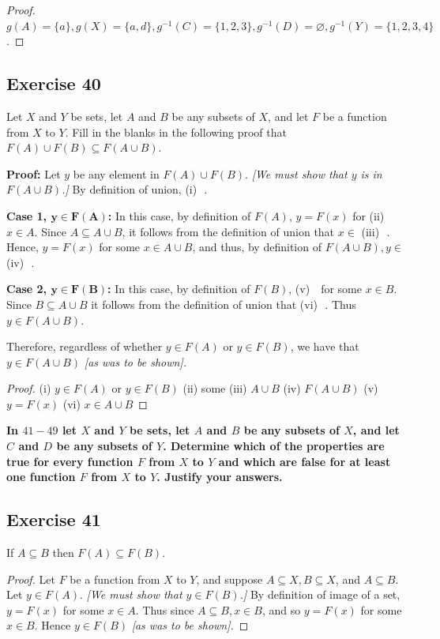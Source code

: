 \documentclass[14pt]{extarticle}
\newcommand{\es}{\varnothing}
\newcommand{\fbl}{\underline{\hspace{1cm}}\,\,}
\newcommand{\cy}{\color{cyan}}
\begin{document}
\begin{proof}
\(g(A) = \{a\}, g(X) = \{a, d\}, g^{-1}(C) = \{1, 2, 3\}, g^{-1}(D) = \es, g^{-1}(Y) = \{1, 2, 3, 4\}\).
\end{proof}

\subsection{Exercise 40}
Let $X$ and $Y$ be sets, let $A$ and $B$ be any subsets of $X$, and let $F$ be a function from $X$ to $Y$. Fill in the 
blanks in the following proof that \(F(A) \cup F (B) \subseteq F(A \cup B)\).

{\bf Proof:} Let $y$ be any element in \(F(A) \cup F(B)\). {\it [We must show that $y$ is in \(F(A \cup B)\).]} By 
definition of union, {\cy (i) \fbl.} 

{\bf Case 1, \(\bm{y \in F(A)}\):} In this case, by definition of $F(A)$, \(y = F(x)\) for {\cy (ii) \fbl} 
\(x \in A\). Since \(A \subseteq A \cup B\), it follows from the definition of union that \(x \in\) {\cy (iii) 
\fbl.} Hence, \(y = F(x)\) for some \(x \in A \cup B\), and thus, by definition of \(F(A \cup B), y \in\) {\cy (iv) \fbl.}

{\bf Case 2, \(\bm{y \in F(B)}\):} In this case, by definition of $F(B)$, {\cy (v) \fbl} for some $x \in B$. 
Since \(B \subseteq A \cup B\) it follows from the definition of union that {\cy (vi) \fbl.} 
Thus \(y \in F(A \cup B)\).

Therefore, regardless of whether \(y \in F(A)\) or \(y \in F(B)\), we have that \(y \in F(A \cup B)\) {\it [as was to be shown].}

\begin{proof}
(i) \(y \in F(A)\) or \(y \in F(B)\) (ii) some (iii) \(A \cup B\) (iv) \(F(A \cup B)\) (v) \(y = F(x)\) (vi) \(x \in A \cup B\)
\end{proof}

{\bf \cy In $41-49$ let $X$ and $Y$ be sets, let $A$ and $B$ be any subsets of $X$, and let $C$ and $D$ be any 
subsets of $Y$. Determine which of the properties are true for every function $F$ from $X$ to $Y$ and which are false 
for at least one function $F$ from $X$ to $Y$. Justify your answers.}

\subsection{Exercise 41}
If \(A \subseteq B\) then \(F(A) \subseteq F(B)\).

\begin{proof}
Let $F$ be a function from $X$ to $Y$, and suppose \(A \subseteq X, B \subseteq X\), and \(A \subseteq B\). 
Let \(y \in F(A)\). {\it [We must show that \(y \in F(B)\).]} By definition of image of a set, \(y = F(x)\) for 
some \(x \in A\). Thus since \(A \subseteq B, x \in B\), and so \(y = F(x)\) for some \(x \in B\). 
Hence \(y \in F(B)\) {\it [as was to be shown].}
\end{proof}
\end{document}
